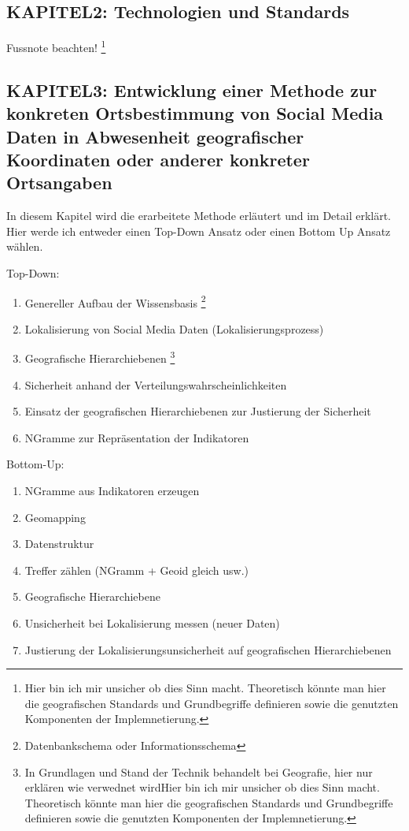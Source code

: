 		\subsection*{KAPITEL2: Technologien und Standards}
		Fussnote beachten!
			\footnote{Hier bin ich mir unsicher ob dies Sinn macht. 
			Theoretisch könnte man hier die geografischen Standards und Grundbegriffe definieren sowie die genutzten Komponenten der Implemnetierung.} 

		\subsection*{KAPITEL3: Entwicklung einer Methode zur konkreten Ortsbestimmung von Social Media Daten in Abwesenheit geografischer Koordinaten oder anderer konkreter Ortsangaben}
			In diesem Kapitel wird die erarbeitete Methode erläutert und im Detail erklärt. 
			Hier werde ich entweder einen Top-Down Ansatz oder einen Bottom Up Ansatz wählen.

			Top-Down:
			\begin{enumerate}
				\item Genereller Aufbau der Wissensbasis \footnote{Datenbankschema oder Informationsschema} 
				\item Lokalisierung von Social Media Daten (Lokalisierungsprozess) 
				\item Geografische Hierarchiebenen \footnote{In Grundlagen und Stand der Technik behandelt bei Geografie, hier nur erklären wie verwednet wirdHier bin ich mir unsicher ob dies Sinn macht. 
			Theoretisch könnte man hier die geografischen Standards und Grundbegriffe definieren sowie die genutzten Komponenten der Implemnetierung.}
				\item Sicherheit anhand der Verteilungswahrscheinlichkeiten
				\item Einsatz der geografischen Hierarchiebenen zur Justierung der Sicherheit    
				\item NGramme zur Repräsentation der Indikatoren
			\end{enumerate}

			Bottom-Up:

		\begin{enumerate}
			\item NGramme aus Indikatoren erzeugen
			\item Geomapping
			\item Datenstruktur
			\item Treffer zählen (NGramm + Geoid gleich usw.)
			\item Geografische Hierarchiebene
			\item Unsicherheit bei Lokalisierung messen (neuer Daten) 
			\item Justierung der Lokalisierungsunsicherheit auf geografischen Hierarchiebenen
		\end{enumerate}

